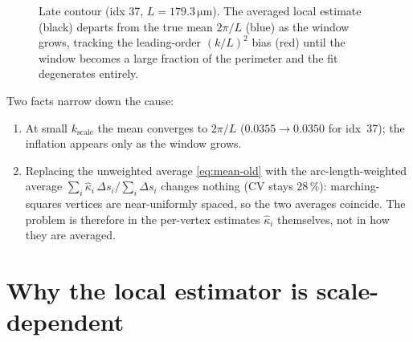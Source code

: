 \documentclass[11pt]{article}
\newcommand{\kbar}{\overline{\kappa}}
\newcommand{\um}{\si{\micro\meter}}
\newcommand{\uminv}{\si{\per\micro\meter}}
\begin{document}
\begin{figure}[h]
  \centering
  \caption{Late contour (idx 37, $L=179.3\,\um$). The averaged local estimate
    (black) departs from the true mean $2\pi/L$ (blue) as the window grows,
    tracking the leading-order $(k/L)^2$ bias (red) until the window becomes a
    large fraction of the perimeter and the fit degenerates entirely.}
  \label{fig:sweep}
\end{figure}

Two facts narrow down the cause:
\begin{enumerate}
  \item At small $k_{\text{scale}}$ the mean converges to $2\pi/L$
    ($0.0355 \to 0.0350$ for idx~37); the inflation appears only as the window
    grows.
  \item Replacing the unweighted average \eqref{eq:mean-old} with the
    arc-length-weighted average
    $\sum_i \widehat{\kappa}_i\,\Delta s_i / \sum_i \Delta s_i$ changes nothing
    (CV stays $28\,\%$): marching-squares vertices are near-uniformly spaced, so
    the two averages coincide. The problem is therefore in the per-vertex
    estimates $\widehat{\kappa}_i$ themselves, not in how they are averaged.
\end{enumerate}

\section{Why the local estimator is scale-dependent}
\label{sec:bias}
\end{document}

